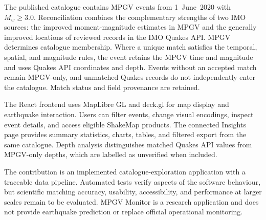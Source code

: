 \documentclass[12pt]{article}
\begin{document}
The published catalogue contains MPGV events from 1~June~2020 with $M_w \geq 3.0$. Reconciliation combines the complementary strengths of two IMO sources: the improved moment-magnitude estimates in MPGV and the generally improved locations of reviewed records in the IMO Quakes API. MPGV determines catalogue membership. Where a unique match satisfies the temporal, spatial, and magnitude rules, the event retains the MPGV time and magnitude and uses Quakes API coordinates and depth. Events without an accepted match remain MPGV-only, and unmatched Quakes records do not independently enter the catalogue. Match status and field provenance are retained.

The React frontend uses MapLibre GL and deck.gl for map display and earthquake interaction. Users can filter events, change visual encodings, inspect event details, and access eligible ShakeMap products. The connected Insights page provides summary statistics, charts, tables, and filtered export from the same catalogue. Depth analysis distinguishes matched Quakes API values from MPGV-only depths, which are labelled as unverified when included.

The contribution is an implemented catalogue-exploration application with a traceable data pipeline. Automated tests verify aspects of the software behaviour, but scientific matching accuracy, usability, accessibility, and performance at larger scales remain to be evaluated. MPGV Monitor is a research application and does not provide earthquake prediction or replace official operational monitoring.

\clearpage
\null
\thispagestyle{empty}
\newpage

\end{document}
